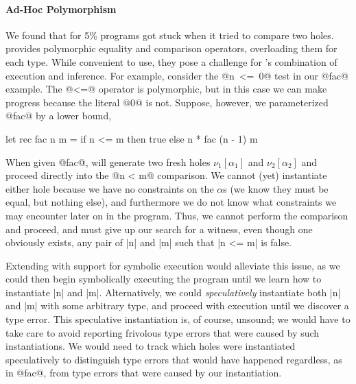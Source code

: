 \paragraph{Ad-Hoc Polymorphism}
%
We found that for 5\% programs \toolname got stuck when it tried to
compare two holes.
%
\ocaml provides polymorphic equality and comparison operators,
overloading them for each type.
%
While convenient to use, they pose a challenge for \toolname's
combination of execution and inference.
%
For example, consider the \hbox{@n <= 0@} test in our @fac@ example.
%
The @<=@ operator is polymorphic, but in this case we can make progress because
the literal @0@ is not.
%
Suppose, however, we parameterized @fac@ by a lower bound, \eg
%
\begin{code}
  let rec fac n m =
    if n <= m then
      true
    else
      n * fac (n - 1) m
\end{code}
%
When given @fac@, \toolname will generate two fresh holes
$\nu_1[\alpha_1]$ and $\nu_2[\alpha_2]$ and proceed directly into the
@n < m@ comparison.
%
We cannot (yet) instantiate either hole because we have no constraints
on the $\alpha$s (we know they must be equal, but nothing else), and
furthermore we do not know what constraints we may encounter later on in
the program.
%
Thus, we cannot perform the comparison and proceed, and must give up our
search for a witness, even though one obviously exists, any pair of |n|
and |m| such that |n <= m| is false.

Extending \toolname with support for symbolic execution would alleviate
this issue, as we could then begin symbolically executing the program
until we learn how to instantiate |n| and |m|.
%
Alternatively, we could \emph{speculatively} instantiate both |n| and
|m| with some arbitrary type, and proceed with execution until we
discover a type error.
%
This speculative instantiation is, of course, unsound; we would have to
take care to avoid reporting frivolous type errors that were caused by
such instantiations.
%
We would need to track which holes were instantiated speculatively 
to distinguish type errors that would have happened regardless, as
in @fac@, from type errors that were caused by our instantiation.

